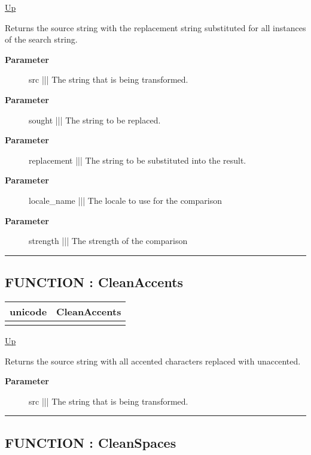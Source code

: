 \hyperlink{ecldoc:Uni}{Up}

\par
Returns the source string with the replacement string substituted for all instances of the search string.

\par
\begin{description}
\item [\textbf{Parameter}] src ||| The string that is being transformed.
\item [\textbf{Parameter}] sought ||| The string to be replaced.
\item [\textbf{Parameter}] replacement ||| The string to be substituted into the result.
\item [\textbf{Parameter}] locale\_name ||| The locale to use for the comparison
\item [\textbf{Parameter}] strength ||| The strength of the comparison
\end{description}

\rule{\textwidth}{0.4pt}
\subsection*{FUNCTION : CleanAccents}
\hypertarget{ecldoc:uni.cleanaccents}{}

{\renewcommand{\arraystretch}{1.5}
\begin{tabularx}{\textwidth}{|>{\raggedright\arraybackslash}l|X|}
\hline
\hspace{0pt}unicode & CleanAccents \\
\hline
\multicolumn{2}{|>{\raggedright\arraybackslash}X|}{\hspace{0pt}(unicode src)} \\
\hline
\end{tabularx}
}

\hyperlink{ecldoc:Uni}{Up}

\par
Returns the source string with all accented characters replaced with unaccented.

\par
\begin{description}
\item [\textbf{Parameter}] src ||| The string that is being transformed.
\end{description}

\rule{\textwidth}{0.4pt}
\subsection*{FUNCTION : CleanSpaces}
\hypertarget{ecldoc:uni.cleanspaces}{}

